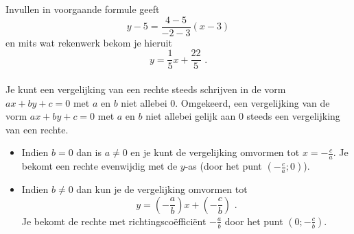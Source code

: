 \begin{voorbeeld}
Invullen in voorgaande formule geeft
\[
y-5=\frac{4-5}{-2-3}(x-3)
\]
en mits wat rekenwerk bekom je hieruit
\[
y=\frac{1}{5}x+\frac{22}{5} \text { .}
\]\\

Je kunt een vergelijking van een rechte steeds schrijven in de vorm $ax+by+c=0$ met $a$ en $b$ niet allebei 0.
Omgekeerd, een vergelijking van de vorm $ax+by+c=0$ met $a$ en $b$ niet allebei gelijk aan 0 steeds een vergelijking van een rechte.
\begin{itemize}
\item Indien $b=0$ dan is $a \neq 0$ en je kunt de vergelijking omvormen tot $x=-\frac{c}{a}$.
Je bekomt een rechte evenwijdig met de $y$-as (door het punt $(-\frac{c}{a};0)$).
\item Indien $b \neq 0$ dan kun je de vergelijking omvormen tot
\[
y=\left( -\frac{a}{b}  \right)x+\left(  -\frac{c}{b} \right) \text { .}
\]
Je bekomt de rechte met richtingsco\"effici\"ent $-\frac {a}{b}$ door het punt $(0; -\frac{c}{b})$.
\end{itemize}

\end{voorbeeld}